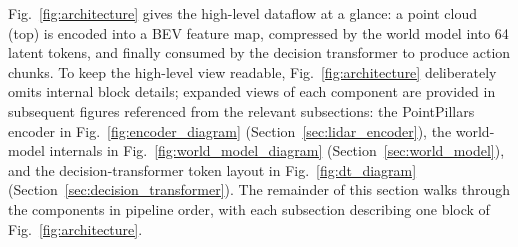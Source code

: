 \documentclass[sensors,article,submit,pdftex,moreauthors]{Definitions/mdpi}
\begin{document}
Fig.~\ref{fig:architecture} gives the high-level dataflow at a glance: a point cloud (top) is encoded into a BEV feature map, compressed by the world model into 64 latent tokens, and finally consumed by the decision transformer to produce action chunks. To keep the high-level view readable, Fig.~\ref{fig:architecture} deliberately omits internal block details; expanded views of each component are provided in subsequent figures referenced from the relevant subsections: the PointPillars encoder in Fig.~\ref{fig:encoder_diagram} (Section~\ref{sec:lidar_encoder}), the world-model internals in Fig.~\ref{fig:world_model_diagram} (Section~\ref{sec:world_model}), and the decision-transformer token layout in Fig.~\ref{fig:dt_diagram} (Section~\ref{sec:decision_transformer}). The remainder of this section walks through the components in pipeline order, with each subsection describing one block of Fig.~\ref{fig:architecture}.
\end{document}
